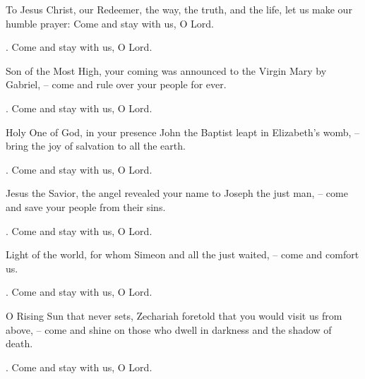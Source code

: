 \lettrine[lines=2]{T}{}o Jesus Christ, our Redeemer, the way, the truth, and the life, let us make our humble prayer: Come and stay with us, O Lord.
\par \Rbar. Come and stay with us, O Lord.

Son of the Most High, your coming was announced to the Virgin Mary by Gabriel,
– come and rule over your people for ever.
\par \Rbar. Come and stay with us, O Lord.

Holy One of God, in your presence John the Baptist leapt in Elizabeth’s womb,
– bring the joy of salvation to all the earth.
\par \Rbar. Come and stay with us, O Lord.

Jesus the Savior, the angel revealed your name to Joseph the just man,
– come and save your people from their sins.
\par \Rbar. Come and stay with us, O Lord.

Light of the world, for whom Simeon and all the just waited,
– come and comfort us.
\par \Rbar. Come and stay with us, O Lord.

O Rising Sun that never sets, Zechariah foretold that you would visit us from above,
– come and shine on those who dwell in darkness and the shadow of death.
\par \Rbar. Come and stay with us, O Lord.
